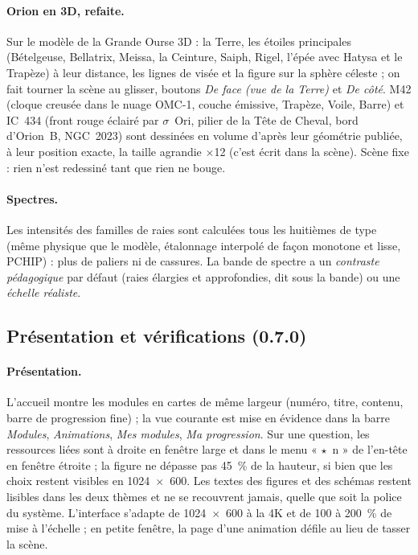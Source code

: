 \paragraph{Orion en 3D, refaite.} Sur le modèle de la Grande Ourse 3D : la Terre, les étoiles principales
(Bételgeuse, Bellatrix, Meissa, la Ceinture, Saiph, Rigel, l'épée avec Hatysa et le Trapèze) à leur distance, les
lignes de visée et la figure sur la sphère céleste ; on fait tourner la scène au glisser, boutons \emph{De face (vue de
la Terre)} et \emph{De côté}. M42 (cloque creusée dans le nuage OMC-1, couche émissive, Trapèze, Voile, Barre) et
IC~434 (front rouge éclairé par $\sigma$~Ori, pilier de la Tête de Cheval, bord d'Orion~B, NGC~2023) sont dessinées en
volume d'après leur géométrie publiée, à leur position exacte, la taille agrandie $\times$12 (c'est écrit dans la scène).
Scène fixe : rien n'est redessiné tant que rien ne bouge.

\paragraph{Spectres.} Les intensités des familles de raies sont calculées tous les huitièmes de type (même physique que
le modèle, étalonnage interpolé de façon monotone et lisse, PCHIP) : plus de paliers ni de cassures. La bande de
spectre a un \emph{contraste pédagogique} par défaut (raies élargies et approfondies, dit sous la bande) ou une
\emph{échelle réaliste}.

\subsection{Présentation et vérifications (0.7.0)}\label{sec:finale}
\paragraph{Présentation.} L'accueil montre les modules en cartes de même largeur (numéro, titre, contenu, barre de
progression fine) ; la vue courante est mise en évidence dans la barre \emph{Modules}, \emph{Animations},
\emph{Mes modules}, \emph{Ma progression}. Sur une question, les ressources liées sont à droite en fenêtre large et
dans le menu « $\star$~n » de l'en-tête en fenêtre étroite ; la figure ne dépasse pas 45~\% de la hauteur, si bien que les
choix restent visibles en 1024~$\times$~600. Les textes des figures et des schémas restent lisibles dans les deux thèmes
et ne se recouvrent jamais, quelle que soit la police du système. L'interface s'adapte de 1024~$\times$~600 à la 4K et
de 100 à 200~\% de mise à l'échelle ; en petite fenêtre, la page d'une animation défile au lieu de tasser la scène.

